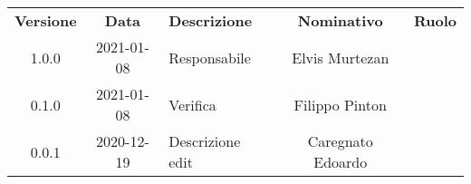 {
    \renewcommand{\arraystretch}{1.5}
    \centering
    \begin{longtable}{ c c  C{4cm}  c  c }
        \rowcolor{\primaryColor}
        \textcolor{\secondaryColor}{
        \textbf{Versione}}     & \textcolor{\secondaryColor}{\textbf{Data}}       & \textcolor{\secondaryColor}
        {\textbf{Descrizione}} & \textcolor{\secondaryColor}{\textbf{Nominativo}} & \textcolor{\secondaryColor}{\textbf{Ruolo}}                          \\


        1.0.0                  & 2021-01-08                                       & Responsabile                                & Elvis Murtezan & \responsabile{} \\
        0.1.0                  & 2021-01-08                                      & Verifica                                    & Filippo Pinton & \verificatore{} \\
        0.0.1                  & 2020-12-19                                       & Descrizione edit                            & Caregnato Edoardo & \redattore{}    \\
    \end{longtable}
}